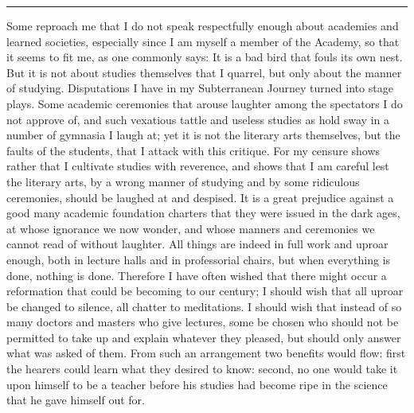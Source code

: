 \documentclass[12pt,a4paper,openany]{book}
\newcommand{\opage}[1]{\marginnote{\footnotesize\textit{[#1]}}}
\newcommand{\sectionrule}{\par\begin{center}\rule{4em}{0.4pt}\end{center}}
\begin{document}
\sectionrule

Some reproach me that I do not speak respectfully enough about academies and
learned societies, especially since I am myself a member of the Academy, so
that it seems to fit me, as one commonly says: It is a bad bird that fouls its
own nest. But it is not about studies themselves that I quarrel, but only about
the manner of studying. Disputations I have in my Subterranean Journey turned
into stage plays. Some academic ceremonies that arouse laughter among the
spectators I do not approve of, and such vexatious tattle and useless studies as
hold sway in a number of gymnasia I laugh at; yet it is not the literary arts
themselves, but the faults of the students, that I attack with this critique.
For my censure shows rather that I cultivate studies with reverence, and shows
that I am careful lest the literary arts, by a wrong manner of studying and by
some ridiculous ceremonies, should be laughed at and despised. It is a great
prejudice against a good many academic foundation charters that they were issued
in the dark ages, at whose ignorance we now wonder, and whose manners and
ceremonies we cannot read of without laughter.
\setcounter{footnote}{0}%
\opage{8}All things are indeed in full work and uproar enough, both in lecture
halls and in professorial chairs, but when everything is done, nothing is done.
Therefore I have often wished that there might occur a reformation that could be
becoming to our century; I should wish that all uproar be changed to silence,
all chatter to meditations. I should wish that instead of so many doctors and
masters who give lectures, some be chosen who should not be permitted to take up
and explain whatever they pleased, but should only answer what was asked of
them. From such an arrangement two benefits would flow: first the hearers could
learn what they desired to know: second, no one would take it upon himself to be
a teacher before his studies had become ripe in the science that he gave himself
out for.
\end{document}
